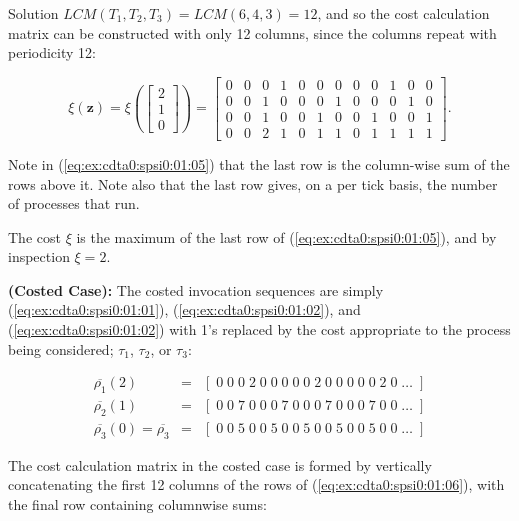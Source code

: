 \begin{vworkexampleparsection}{Solution}
$LCM(T_1, T_2, T_3) = LCM(6, 4, 3) = 12$, and so the cost calculation matrix
can be constructed with only 12 columns, since the columns repeat with periodicity
12:

\begin{equation}
\label{eq:ex:cdta0:spsi0:01:05}
\xi(\mathbf{z})
= 
\xi\left(\left[\begin{array}{c}2\\1\\0\end{array}\right]\right)
=
\left[
\begin{array}{rrrrrrrrrrrr}
0 & 0 & 0 & 1 & 0 & 0 & 0 & 0 & 0 & 1 & 0 & 0 \\
0 & 0 & 1 & 0 & 0 & 0 & 1 & 0 & 0 & 0 & 1 & 0 \\
0 & 0 & 1 & 0 & 0 & 1 & 0 & 0 & 1 & 0 & 0 & 1 \\
0 & 0 & 2 & 1 & 0 & 1 & 1 & 0 & 1 & 1 & 1 & 1
\end{array}
\right]
.
\end{equation}

Note in (\ref{eq:ex:cdta0:spsi0:01:05}) that the last row is
the column-wise sum of the rows above it.  Note also that
the last row gives, on a per tick basis, the number of processes
that run.

The cost $\xi$ is the maximum of the last row of (\ref{eq:ex:cdta0:spsi0:01:05}),
and by inspection $\xi = 2$.

\textbf{(Costed Case):}
The costed invocation sequences are simply 
(\ref{eq:ex:cdta0:spsi0:01:01}), (\ref{eq:ex:cdta0:spsi0:01:02}), and
(\ref{eq:ex:cdta0:spsi0:01:02}) with 1's replaced by the cost appropriate
to the process being considered;  $\tau_1$, $\tau_2$, or $\tau_3$:

\begin{eqnarray}
\nonumber
\overline{\rho_1}(2)  & = &  [ \; 0 \; 0 \; 0 \; 2 \; 0 \; 0 \; 0 \; 0 \; 0 \; 2 \; 
 0 \; 0 \; 0 \; 0 \; 0 \; 2 \; 0 \; \ldots \; ] \\
\label{eq:ex:cdta0:spsi0:01:06}
\overline{\rho_2}(1)  & = & [ \; 0 \; 0 \; 7 \; 0 \; 0 \; 0 \; 7 \; 0 \; 0 \; 0 \; 
 7 \; 0 \; 0 \; 0 \; 7 \; 0 \; 0 \; \ldots \; ]  \\
\nonumber
\overline{\rho_3}(0) = \overline{\rho_3} & = &  [ \; 0 \; 0 \; 5 \; 0 \; 0 \; 5 \; 0 \; 0 \; 5 \; 0 \; 
 0 \; 5 \; 0 \; 0 \; 5 \; 0 \; 0 \; \ldots \; ] 
\end{eqnarray}

The cost calculation matrix in the costed case is formed by vertically concatenating the
first 12 columns of the rows of (\ref{eq:ex:cdta0:spsi0:01:06}), with the 
final row containing columnwise sums:


\end{vworkexampleparsection}
